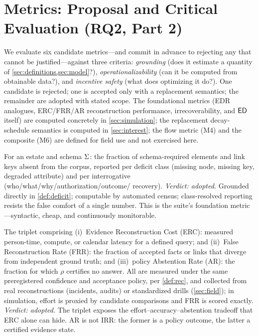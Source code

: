 \section{Metrics: Proposal and Critical Evaluation (RQ2, Part 2)}
\label{sec:metrics}

We evaluate six candidate metrics---and commit in advance to rejecting any that
cannot be justified---against three criteria: \emph{grounding}
(does it estimate a quantity of \cref{sec:definitions,sec:model}?),
\emph{operationalizability} (can it be computed from obtainable data?), and
\emph{incentive safety} (what does optimizing it do?). One candidate is rejected;
one is accepted only with a replacement semantics; the remainder are adopted with
stated scope. The foundational metrics (EDR analogues, ERC/FRR/AR reconstruction performance,
irrecoverability, and $\mathsf{ED}$ itself) are computed concretely in
\cref{sec:simulation}; the replacement decay-schedule semantics is computed in
\cref{sec:interest}; the flow metric (M4) and the composite (M6) are defined for
field use and not exercised here.

\begin{metricdef}
\label{met:edr}
For an estate and schema $\Sigma$: the fraction of schema-required elements and link
keys absent from the corpus, reported per deficit class (missing node, missing key,
degraded attribute) and per interrogative (who/what/why/authorization/outcome/%
recovery). \emph{Verdict: adopted.} Grounded directly in \cref{def:deficit};
computable by automated census; class-resolved reporting resists the false comfort
of a single number. This is the suite's foundation metric---syntactic, cheap, and
continuously monitorable.
\end{metricdef}

\begin{metricdef}
\label{met:erc}
The triplet comprising (i)~Evidence Reconstruction Cost (ERC): measured person-time,
compute, or calendar latency for a defined query; and (ii)~False Reconstruction
Rate (FRR): the fraction of accepted facts or links that diverge from independent
ground truth; and (iii)~policy Abstention Rate (AR): the fraction for which $\rho$
certifies no answer. All are measured under the same preregistered confidence and
acceptance policy, per \cref{def:rec}, and collected from
real reconstructions (incidents, audits) or standardized drills (\cref{sec:field});
in simulation, effort is proxied by candidate comparisons and FRR is scored exactly.
\emph{Verdict: adopted.} The triplet exposes the effort--accuracy--abstention
tradeoff that ERC alone can hide. AR is not IRR: the former is a policy outcome,
the latter a certified evidence state.
\end{metricdef}

